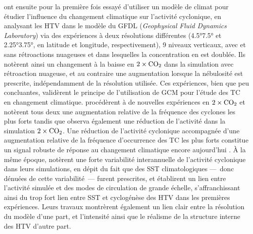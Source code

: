 \documentclass[../main.tex]{subfiles}
\begin{document}
\textcite{broccoli_can_1990} ont ensuite pour la première fois essayé d'utiliser un modèle de climat pour étudier l'influence du changement climatique sur
l'activité cyclonique, en analysant les HTV dans le modèle du GFDL (\textit{Geophysical Fluid Dynamics Laboratory}) via des expériences à deux résolutions
différentes (\ang{4.5}\times\ang{7.5} et \ang{2.25}\times\ang{3.75}, en latitude et longitude, respectivement), \num{9} niveaux verticaux, avec et sans
rétroactions nuageuses et dans lesquelles la concentration en  est doublée. Ils notèrent ainsi un changement à la baisse en \ensuremath{2\times\ce{CO2}}
dans la simulation avec rétroaction nuageuse, et au contraire une augmentation lorsque la nébulosité est prescrite, indépendamment de la résolution utilisée.
Ces expériences, bien que peu concluantes, validèrent le principe de l'utilisation de GCM pour l'étude des TC en changement climatique.
\textcite{haarsma_tropical_1993,bengtsson_will_1996} procédèrent à de nouvelles expériences en \ensuremath{2\times\ce{CO2}} et notèrent tous deux une augmentation
relative de la fréquence des cyclones les plus forts tandis que \textcite{bengtsson_will_1996} observa également une réduction de l'activité dans la simulation
\ensuremath{2\times\ce{CO2}}. Une réduction de l'activité cyclonique accompagnée d'une augmentation relative de la fréquence d'occurrence des TC les plus forts
constitue un signal robuste de réponse au changement climatique encore aujourd'hui \parencite[][voir
\cref{sec:projections_futures}]{walsh_tropical_2016,camargo_tropical_2016,knutson_tropical_2010,knutson_tropical_2010,seneviratne_weather_2021}. À la même
époque, \textcite{bengtsson_hurricanetype_1995} notèrent une forte variabilité interannuelle de l'activité cyclonique dans leurs simulations, en dépit du fait que
des SST climatologiques ---~donc dénuées de cette variabilité~--- furent prescrites, et établirent un lien entre l'activité simulée et des modes de circulation
de grande échelle, s'affranchissant ainsi du trop fort lien entre SST et cyclogénèse des HTV dans les premières expériences. Leurs travaux montrèrent également
un lien clair entre la résolution du modèle d'une part, et l'intensité ainsi que le réalisme de la structure interne des HTV d'autre part.
\end{document}
